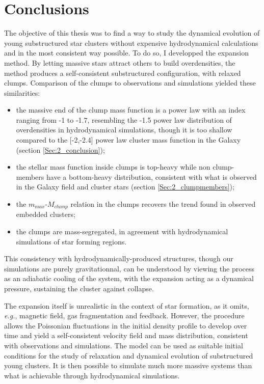 \chapter{Conclusions}

The objective of this thesis was to find a way to study the dynamical evolution of young substructured star clusters without expensive hydrodynamical calculations and in the most consistent way possible. To do so, I developped the \HubLem expansion method. By letting massive stars attract others to build overdensities, the method produces a self-consistent substructured configuration, with relaxed clumps. Comparison of the clumps to observations and simulations yielded these similarities:

\begin{itemize}
\item the massive end of the clump mass function is a power law with an index ranging from -1 to -1.7, resembling the -1.5 power law distribution of overdensities in hydrodynamical simulations, though it is too shallow compared to the [-2,-2.4] power law cluster mass function in the Galaxy (section \ref{Sec:2_conclusion});
\item the stellar mass function inside clumps is top-heavy while non clump-members have a bottom-heavy distribution, consistent with what is observed in the Galaxy field and cluster stars (section \ref{Sec:2_clumpmembers});
\item the $m_{max}$-$M_{clump}$ relation in the clumps recovers the trend found in observed embedded clusters;
\item the clumps are mass-segregated, in agreement with hydrodynamical simulations of star forming regions.
\end{itemize}

This consistency with hydrodynamically-produced structures, though our simulations are purely gravitationnal, can be understood by viewing the \HubLem process as an adiabatic cooling of the system, with the expansion acting as a dynamical pressure, sustaining the cluster against collapse.

The expansion itself is unrealistic in the context of star formation, as it omits, \textit{e.g.}, magnetic field, gas fragmentation and feedback. However, the procedure allows the Poissonian fluctuations in the initial density profile to develop over time and yield a self-consistent velocity field and mass distribution, consistent with observations and simulations. The model can be used as suitable initial conditions for the study of relaxation and dynamical evolution of substructured young clusters. It is then possible to simulate much more massive systems than what is achievable through hydrodynamical simulations.

